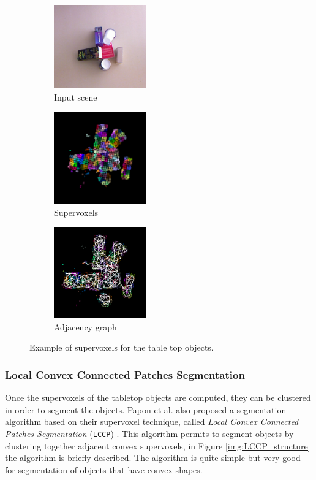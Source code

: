 \begin{figure}[h]
\centering
\begin{subfigure}[t]{0.3\textwidth}
\centering
\includegraphics[width=4cm]{Img/ObjectSegmentation/seg1_rgb.png}
\caption{Input scene}
\end{subfigure}
\begin{subfigure}[t]{0.3\textwidth}
\centering
\includegraphics[width=4cm]{Img/ObjectSegmentation/voxel2.png}
\caption{Supervoxels}
\end{subfigure}
\begin{subfigure}[t]{0.3\textwidth}
\centering
\includegraphics[width=4cm]{Img/ObjectSegmentation/voxel1.png}
\caption{Adjacency graph}
\end{subfigure}
\caption{Example of supervoxels for the table top objects.}\label{fig:voxels_results}
\end{figure}

\subsubsection{Local Convex Connected Patches Segmentation}
\label{sec:LCCP}
Once the supervoxels of the tabletop objects are computed, they can be clustered in order to segment the objects. Papon et al. also proposed a segmentation algorithm based on their supervoxel technique, called \textit{Local Convex Connected Patches Segmentation} (\texttt{LCCP}) \citep{LCCP}. This algorithm permits to segment objects by clustering together adjacent convex supervoxels, in Figure \ref{img:LCCP_structure} the algorithm is briefly described.   The algorithm is quite simple but very good for segmentation of objects that have convex shapes. 

